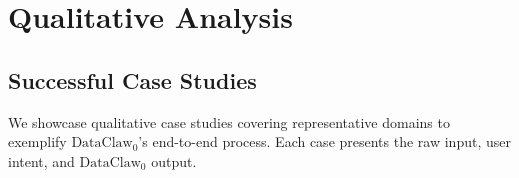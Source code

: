 


\section{Qualitative Analysis}
\label{app:qualitative_limitations}

\subsection{Successful Case Studies}
\label{app:success_cases}

We showcase qualitative case studies covering representative domains to exemplify $\text{DataClaw}_0$’s end-to-end process.
Each case presents the raw input, user intent, and $\text{DataClaw}_0$ output.



